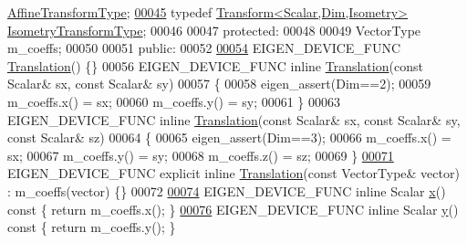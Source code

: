 \begin{DoxyCode}
      \hyperlink{group___geometry___module_a25c762409320ba9490a0d12c6652bbad}{AffineTransformType};
\hyperlink{group___geometry___module_ad3ac890d85420ba78e16dab1983d1a80}{00045}   \textcolor{keyword}{typedef} \hyperlink{group___geometry___module_class_eigen_1_1_transform}{Transform<Scalar,Dim,Isometry>} 
      \hyperlink{group___geometry___module_ad3ac890d85420ba78e16dab1983d1a80}{IsometryTransformType};
00046 
00047 \textcolor{keyword}{protected}:
00048 
00049   VectorType m\_coeffs;
00050 
00051 \textcolor{keyword}{public}:
00052 
\hyperlink{group___geometry___module_a6220051bf3a13f8180ddefbae198493e}{00054}   EIGEN\_DEVICE\_FUNC \hyperlink{group___geometry___module_a6220051bf3a13f8180ddefbae198493e}{Translation}() \{\}
00056   EIGEN\_DEVICE\_FUNC \textcolor{keyword}{inline} \hyperlink{group___geometry___module_a6220051bf3a13f8180ddefbae198493e}{Translation}(\textcolor{keyword}{const} Scalar& sx, \textcolor{keyword}{const} Scalar& sy)
00057   \{
00058     eigen\_assert(Dim==2);
00059     m\_coeffs.x() = sx;
00060     m\_coeffs.y() = sy;
00061   \}
00063   EIGEN\_DEVICE\_FUNC \textcolor{keyword}{inline} \hyperlink{group___geometry___module_a6220051bf3a13f8180ddefbae198493e}{Translation}(\textcolor{keyword}{const} Scalar& sx, \textcolor{keyword}{const} Scalar& sy, \textcolor{keyword}{const} Scalar& sz)
00064   \{
00065     eigen\_assert(Dim==3);
00066     m\_coeffs.x() = sx;
00067     m\_coeffs.y() = sy;
00068     m\_coeffs.z() = sz;
00069   \}
\hyperlink{group___geometry___module_a15486f7732b28f0f9e8515de754bc78d}{00071}   EIGEN\_DEVICE\_FUNC \textcolor{keyword}{explicit} \textcolor{keyword}{inline} \hyperlink{group___geometry___module_a15486f7732b28f0f9e8515de754bc78d}{Translation}(\textcolor{keyword}{const} VectorType& vector) : m\_coeffs(vector) \{\}
00072 
\hyperlink{group___geometry___module_a7725474718c60450a7007d1711e58a81}{00074}   EIGEN\_DEVICE\_FUNC \textcolor{keyword}{inline} Scalar \hyperlink{group___geometry___module_a7725474718c60450a7007d1711e58a81}{x}()\textcolor{keyword}{ const }\{ \textcolor{keywordflow}{return} m\_coeffs.x(); \}
\hyperlink{group___geometry___module_a8fa354dd285528cc48555054ccbd7e4c}{00076}   EIGEN\_DEVICE\_FUNC \textcolor{keyword}{inline} Scalar \hyperlink{group___geometry___module_a8fa354dd285528cc48555054ccbd7e4c}{y}()\textcolor{keyword}{ const }\{ \textcolor{keywordflow}{return} m\_coeffs.y(); \}

\end{DoxyCode}
